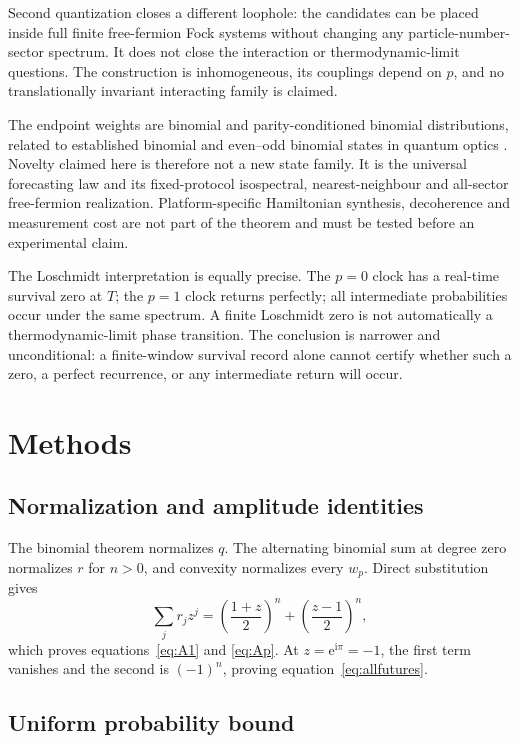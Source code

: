 \documentclass[12pt]{article}
\newcommand{\ee}{\mathrm e}
\newcommand{\ii}{\mathrm i}
\begin{document}
Second quantization closes a different loophole: the candidates can be
placed inside full finite free-fermion Fock systems without changing any
particle-number-sector spectrum. It does not close the interaction or
thermodynamic-limit questions. The construction is inhomogeneous, its
couplings depend on \(p\), and no translationally invariant interacting
family is claimed.

The endpoint weights are binomial and parity-conditioned binomial
distributions, related to established binomial and even--odd binomial
states in quantum optics \cite{Stoler1985,Zhang2009}. Novelty claimed here
is therefore not a new state family. It is the universal forecasting law
and its fixed-protocol isospectral, nearest-neighbour and all-sector
free-fermion realization.
Platform-specific Hamiltonian synthesis, decoherence and measurement cost
are not part of the theorem and must be tested before an experimental claim.

The Loschmidt interpretation is equally precise. The \(p=0\) clock has a
real-time survival zero at \(T\); the \(p=1\) clock returns perfectly; all
intermediate probabilities occur under the same spectrum. A finite
Loschmidt zero is not automatically a thermodynamic-limit phase transition.
The conclusion is narrower and unconditional: a finite-window survival
record alone cannot certify whether such a zero, a perfect recurrence, or
any intermediate return will occur.

\section*{Methods}

\subsection*{Normalization and amplitude identities}

The binomial theorem normalizes \(q\). The alternating binomial sum at
degree zero normalizes \(r\) for \(n>0\), and convexity normalizes every
\(w_p\). Direct substitution gives
\[
\sum_j r_j z^j
=\left(\frac{1+z}{2}\right)^n+
\left(\frac{z-1}{2}\right)^n,
\]
which proves equations~\eqref{eq:A1} and \eqref{eq:Ap}. At
\(z=\ee^{\ii\pi}=-1\), the first term vanishes and the second is
\((-1)^n\), proving equation~\eqref{eq:allfutures}.

\subsection*{Uniform probability bound}
\end{document}
